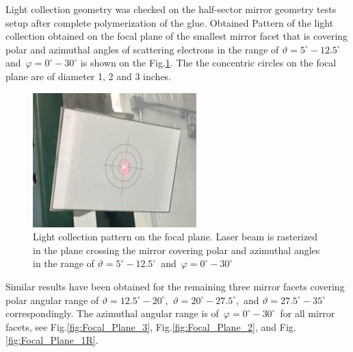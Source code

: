 \indent Light collection geometry was checked on the half-sector mirror geometry tests setup after complete polymerization of the glue. Obtained Pattern of the light collection obtained on the focal plane of the smallest mirror facet that is covering polar and azimuthal angles of scattering electrons in the range of $\vartheta = 5^\circ - 12.5^\circ$\, and\, $\varphi = 0^\circ - 30^\circ$ is shown on the Fig.\ref{fig:Focal_Plane_4}. The the concentric circles on the focal plane are of diameter 1, 2 and 3 inches.  

\begin{figure}[ht]
    \centering
    \includegraphics[width=0.90\linewidth]{images/Focal_Plane_4.jpg}
    \caption{Light collection pattern on the focal plane. Laser beam is rasterized in the plane crossing the mirror covering polar and azimuthal angles in the range of $\vartheta = 5^\circ - 12.5^\circ$\, and\, $\varphi = 0^\circ - 30^\circ$}
    \label{fig:Focal_Plane_4}
\end{figure}

Similar results have been obtained for the remaining three mirror facets covering polar angular range of $\vartheta = 12.5^\circ - 20^\circ$,\, $\vartheta = 20^\circ - 27.5^\circ$,\, and $\vartheta = 27.5^\circ - 35^\circ$\, correspondingly. The azimuthal angular range is of\, $\varphi = 0^\circ - 30^\circ$\, for all mirror facets, see Fig.\ref{fig:Focal_Plane_3}, Fig.\ref{fig:Focal_Plane_2}, and Fig.\ref{fig:Focal_Plane_1R}.

